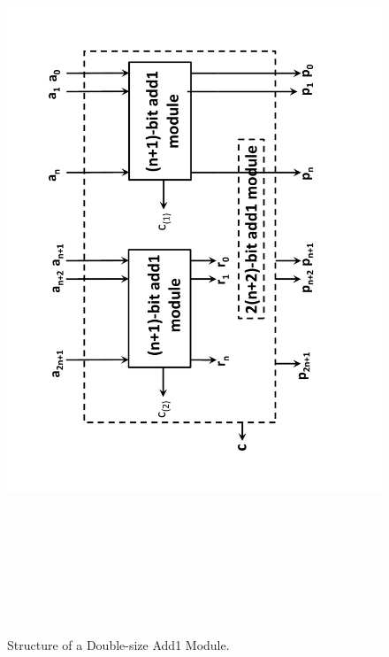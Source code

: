 \documentclass[handout]{mcs}
\begin{document}
\begin{figure}[htbp]
\includegraphics[height=9in]{latex-macros/figures/add1-circuit-diagram.pdf}
\caption{Structure of a Double-size Add1 Module.}
\label{fig:add1}
\end{figure}

\end{document}
